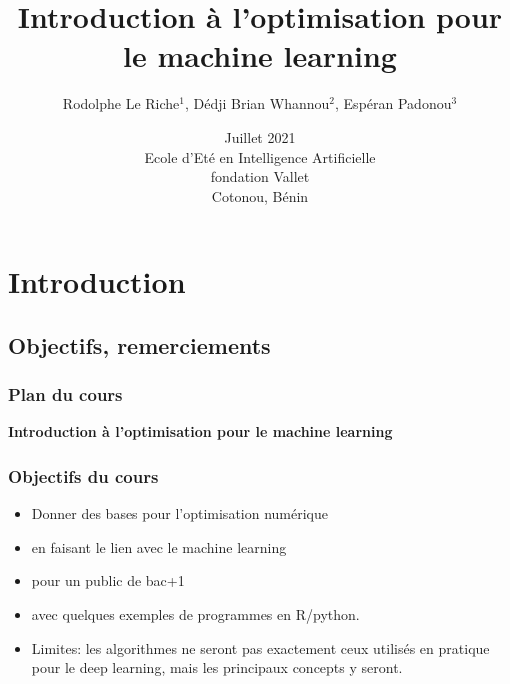 \documentclass[12pt]{beamer}
\begin{document}
\title
[~Optimisation pour le machine learning
]
{Introduction à l'optimisation pour le machine learning}
\author
[Le Riche et al.]
{\large Rodolphe Le Riche$^1$, Dédji Brian Whannou$^2$, Espéran Padonou$^3$} 
\date[Juillet 2021]{Juillet 2021 \\
Ecole d'Eté en Intelligence Artificielle \\
fondation Vallet\\
Cotonou, Bénin} 
\begin{frame}
\titlepage
\end{frame}

\section{Introduction}
\subsection{Objectifs, remerciements}

\begin{frame}%
\frametitle{Plan du cours} 
\begin{center} \textbf{Introduction à l'optimisation pour le machine learning} \end{center}
\tableofcontents[currentsection]
\end{frame}

\begin{frame}
\frametitle{Objectifs du cours}
\begin{itemize}
\item Donner des bases pour l'optimisation numérique
\item en faisant le lien avec le machine learning
\item pour un public de bac+1
\item avec quelques exemples de programmes en R/python.
\item Limites: les algorithmes ne seront pas exactement ceux utilisés en pratique pour le deep learning, mais les principaux concepts y seront.
\end{itemize}
\end{frame}
\end{document}
